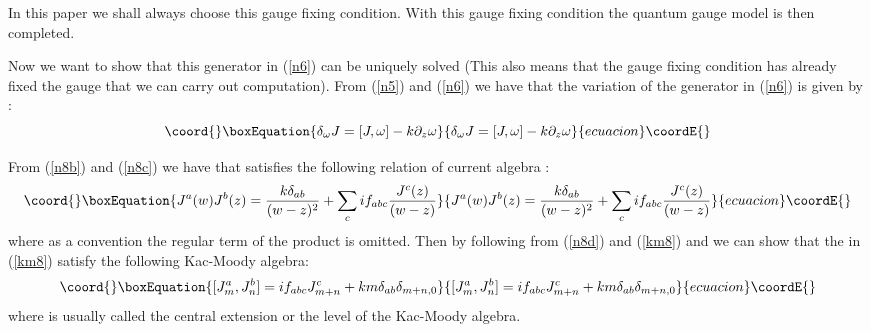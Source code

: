 \documentclass[a4paper,a4paper]{article}
\begin{document}
In this paper we shall always choose this gauge fixing condition.
With this gauge fixing condition the
quantum gauge model is then completed.


Now we want to show that this generator \coordHE{} in (\ref{n6})
can be uniquely solved (This also means that the gauge fixing condition has already fixed the gauge that we can carry out computation).
From (\ref{n5}) and (\ref{n6}) we have that the variation \coordHE{}
of the generator \coordHE{} in (\ref{n6}) is given by
\cite{Fra}\cite{Kni}:
\begin{equation}\coord{}\boxEquation{
\delta_{\omega}J= \lbrack J, \omega\rbrack -k\partial_z \omega
\label{n8c}
}{
\delta_{\omega}J= \lbrack J, \omega\rbrack -k\partial_z \omega
}{ecuacion}\coordE{}\end{equation}

From (\ref{n8b}) and (\ref{n8c}) we have that \coordHE{} satisfies
the following relation of current algebra \cite{Fra}\cite{Fuc}\cite{Kni}:
\begin{equation}\coord{}\boxEquation{
J^a(w)J^b(z)=\frac{k\delta_{ab}}{(w-z)^2}
+\sum_{c}if_{abc}\frac{J^c(z)}{(w-z)}
\label{n8d}
}{
J^a(w)J^b(z)=\frac{k\delta_{ab}}{(w-z)^2}
+\sum_{c}if_{abc}\frac{J^c(z)}{(w-z)}
}{ecuacion}\coordE{}\end{equation}
where as a convention the regular term of the product \coordHE{}
is omitted.
Then by following \cite{Fra}\cite{Fuc}\cite{Kni} from (\ref{n8d}) and (\ref{km8}) and  we can show that 
the \coordHE{} in (\ref{km8}) satisfy the following  Kac-Moody algebra: 
\begin{equation}\coord{}\boxEquation{
[J_m^a, J_n^b] =
if_{abc}J_{m+n}^c + km\delta_{ab}\delta_{m+n, 0}
\label{n8}
}{
[J_m^a, J_n^b] =
if_{abc}J_{m+n}^c + km\delta_{ab}\delta_{m+n, 0}
}{ecuacion}\coordE{}\end{equation}
where \coordHE{} is  usually called the central extension
or the level of the Kac-Moody algebra.
\end{document}

